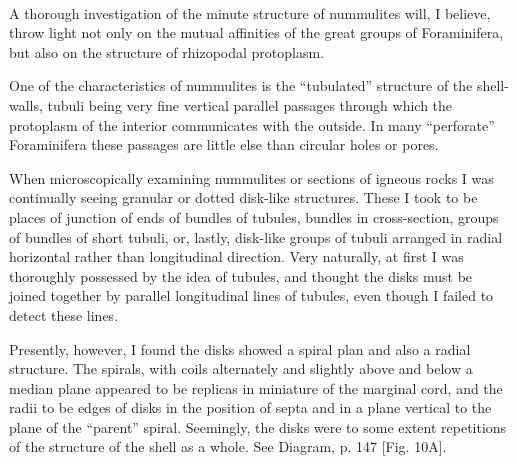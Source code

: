 \documentclass[a4paper, 12pt, oneside, landscape]{article}
\begin{document}
\paragraph{}
A thorough investigation of the minute structure of nummulites will, I believe, throw light not only on the mutual affinities of the great groups of Foraminifera, but also on the structure of rhizopodal protoplasm.

One of the characteristics of nummulites is the ``tubulated'' structure of the shell-walls, tubuli being very fine vertical parallel passages through which the protoplasm of the interior communicates with the outside. In many ``perforate'' Foraminifera these passages are little else than circular holes or pores.

When microscopically examining nummulites or sections of igneous rocks I was continually seeing granular or dotted disk-like structures. These I took to be places of junction of ends of bundles of tubules, bundles in cross-section, groups of bundles of short tubuli, or, lastly, disk-like groups of tubuli arranged in radial horizontal rather than longitudinal direction. Very naturally, at first I was thoroughly possessed by the idea of tubules, and thought the disks must be joined together by parallel longitudinal lines of tubules, even though I failed to detect these lines.

Presently, however, I found the disks showed a spiral plan and also a radial structure. The spirals, with coils alternately and slightly above and below a median plane appeared to be replicas in miniature of the marginal cord, and the radii to be edges of disks in the position of septa and in a plane vertical to the plane of the ``parent'' spiral. Seemingly, the disks were to some extent repetitions of the structure of the shell as a whole. See Diagram, p. 147 [Fig. 10A].
\end{document}
